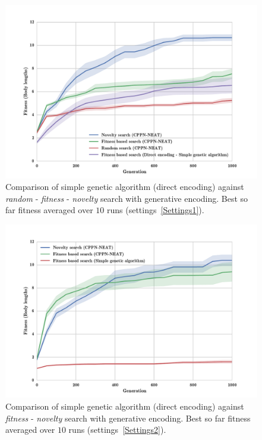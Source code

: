 \begin{figure}[ht!]
\centering
\includegraphics[width=1.0\textwidth]{../Figures/Results/FitNovRandomDirectSize5.pdf}
\caption{Comparison of simple genetic algorithm (direct encoding) against \emph{random} - \emph{fitness} - \emph{novelty} search with generative encoding. Best so far fitness averaged over $10$ runs (settings~\ref{Settings1}).}
\label{fig:FitNovRandomDirectSize5}
\end{figure}

\begin{figure}[ht!]
\centering
\includegraphics[width=1.0\textwidth]{../Figures/Results/FitvsNovVsDirSize10.pdf}
\caption{Comparison of simple genetic algorithm (direct encoding) against \emph{fitness} - \emph{novelty} search with generative encoding. Best so far fitness averaged over $10$ runs (settings~\ref{Settings2}).}
\label{fig:FitvsNovVsDirSize10}
\end{figure}


